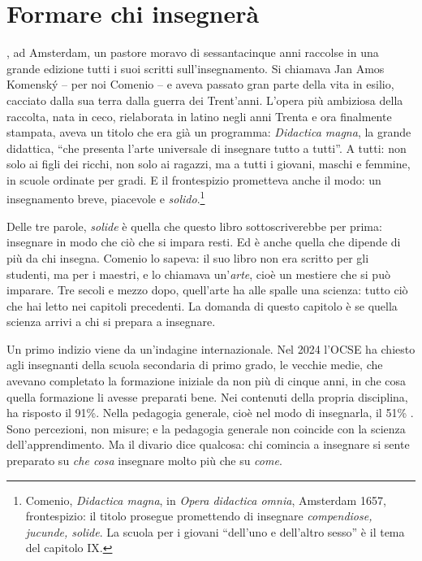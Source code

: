 \chapter{Formare chi insegnerà}
\label{cap:formatori}


, ad Amsterdam, un pastore moravo di sessantacinque
anni raccolse in una grande edizione tutti i suoi scritti
sull'insegnamento. Si chiamava Jan Amos Komenský -- per noi Comenio
-- e aveva passato gran parte della vita in esilio, cacciato dalla sua
terra dalla guerra dei Trent'anni. L'opera più ambiziosa della
raccolta, nata in ceco, rielaborata in latino negli anni Trenta e ora
finalmente stampata, aveva
un titolo che era già un programma: \emph{Didactica magna}, la grande
didattica, \enquote{che presenta l'arte universale di insegnare tutto
a tutti}. A tutti: non solo ai figli dei ricchi, non solo ai ragazzi,
ma a tutti i giovani, maschi e femmine, in scuole ordinate per gradi.
E il frontespizio prometteva anche il modo: un insegnamento breve,
piacevole e \emph{solido}.\footnote{Comenio, \emph{Didactica magna},
in \emph{Opera didactica omnia}, Amsterdam 1657, frontespizio: il
titolo prosegue promettendo di insegnare \emph{compendiose, jucunde,
solide}. La scuola per i giovani \enquote{dell'uno e dell'altro sesso}
è il tema del capitolo IX.}

Delle tre parole, \emph{solide} è quella che questo libro
sottoscriverebbe per prima: insegnare in modo che ciò che si impara
resti. Ed è anche quella che dipende di più da chi insegna. Comenio lo
sapeva: il suo libro non era scritto per gli studenti, ma per i
maestri, e lo chiamava un'\emph{arte}, cioè un mestiere che si può
imparare. Tre secoli e mezzo dopo, quell'arte ha alle spalle una
scienza: tutto ciò che hai letto nei capitoli precedenti. La domanda
di questo capitolo è se quella scienza arrivi a chi si prepara a
insegnare.

Un primo indizio viene da un'indagine internazionale. Nel 2024 l'OCSE
ha chiesto agli insegnanti della scuola secondaria di primo grado, le
vecchie medie, che avevano completato la formazione iniziale da non
più di cinque anni, in che cosa quella formazione li avesse preparati
bene. Nei contenuti della propria disciplina, ha risposto il 91\%.
Nella pedagogia generale, cioè nel modo di insegnarla, il 51\%
\parencite{oecd2025talis}. Sono percezioni, non misure; e la pedagogia
generale non coincide con la scienza dell'apprendimento. Ma il divario
dice qualcosa: chi comincia a insegnare si sente preparato su
\emph{che cosa} insegnare molto più che su \emph{come}.

